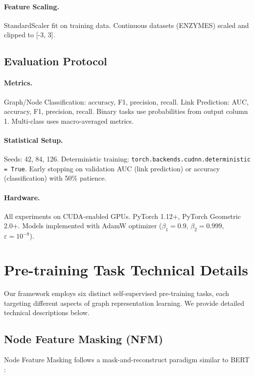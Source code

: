 \documentclass[11pt]{article}
\begin{document}
\paragraph{Feature Scaling.} StandardScaler fit on training data. Continuous datasets (ENZYMES) scaled and clipped to [-3, 3].

\subsection{Evaluation Protocol}

\paragraph{Metrics.} Graph/Node Classification: accuracy, F1, precision, recall. Link Prediction: AUC, accuracy, F1, precision, recall. Binary tasks use probabilities from output column 1. Multi-class uses macro-averaged metrics.

\paragraph{Statistical Setup.} Seeds: 42, 84, 126. Deterministic training: \texttt{torch.backends.cudnn.deterministic = True}. Early stopping on validation AUC (link prediction) or accuracy (classification) with 50\% patience.

\paragraph{Hardware.} All experiments on CUDA-enabled GPUs. PyTorch 1.12+, PyTorch Geometric 2.0+. Models implemented with AdamW optimizer ($\beta_1 = 0.9$, $\beta_2 = 0.999$, $\varepsilon = 10^{-8}$).

\section{Pre-training Task Technical Details}
\label{sec:pretrain-tasks}

Our framework employs six distinct self-supervised pre-training tasks, each targeting different aspects of graph representation learning. We provide detailed technical descriptions below.

\subsection{Node Feature Masking (NFM)}
\label{sec:nfm}

Node Feature Masking follows a mask-and-reconstruct paradigm similar to BERT \citep{devlin2019bert}:
\end{document}

